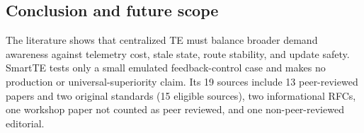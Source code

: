 \subsection{Conclusion and future scope}
The literature shows that centralized TE must balance broader demand awareness against telemetry cost, stale state, route stability, and update safety. SmartTE tests only a small emulated feedback-control case and makes no production or universal-superiority claim. Its 19 sources include 13 peer-reviewed papers and two original standards (15 eligible sources), two informational RFCs, one workshop paper not counted as peer reviewed, and one non-peer-reviewed editorial.
